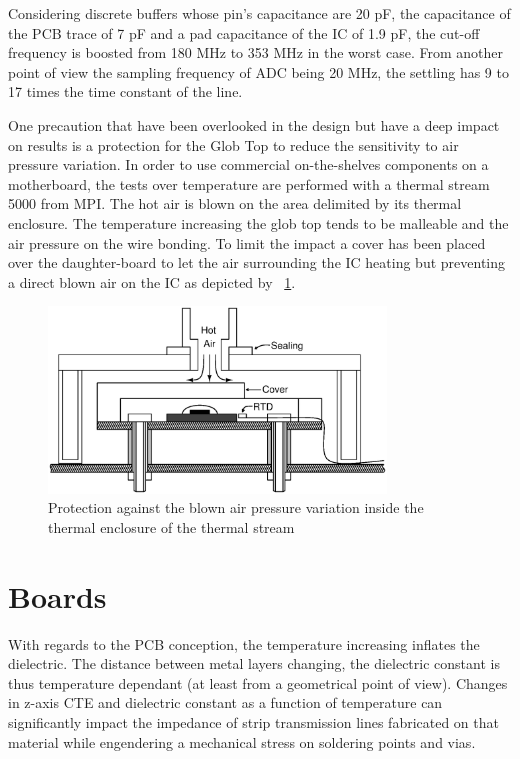 Considering discrete buffers whose pin's capacitance are 20 pF, the capacitance of the PCB trace of 7 pF and a pad capacitance of the IC of 1.9 pF, the cut-off frequency is boosted from 180 MHz to 353 MHz in the worst case. From another point of view the sampling frequency of ADC being 20 MHz, the settling has 9 to 17 times the time constant of the line.

One precaution that have been overlooked in the design but have a deep impact on results is a protection for the Glob Top to reduce the sensitivity to air pressure variation. In order to use commercial on-the-shelves components on a motherboard, the tests over temperature are performed with a thermal stream 5000 from MPI\@. The hot air is blown on the area delimited by its thermal enclosure. The temperature increasing the glob top tends to be malleable and the air pressure on the wire bonding. To limit the impact a cover has been placed over the daughter-board to let the air surrounding the IC heating but preventing a direct blown air on the IC as depicted by \figurename~\ref{fig:thermalstream-air-protection}.

\begin{figure}[htp]
    \centering
    \includegraphics[width=0.8\textwidth]{Chapter5/Figs/PCB/thermal-stream-protection.ps}
    \caption{Protection against the blown air pressure variation inside the thermal enclosure of the thermal stream}
    \label{fig:thermalstream-air-protection}
\end{figure}

\section{Boards}
With regards to the PCB conception, the temperature increasing inflates the dielectric. The distance between metal layers changing, the dielectric constant is thus temperature dependant (at least from a geometrical point of view). Changes in z-axis CTE and dielectric constant as a function of temperature can significantly impact the impedance of strip transmission lines fabricated on that material while engendering a mechanical stress on soldering points and vias.


